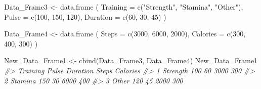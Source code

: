 \documentclass[
]{book}
\newenvironment{Shaded}{\begin{snugshade}}{\end{snugshade}}
\newcommand{\AttributeTok}[1]{\textcolor[rgb]{0.77,0.63,0.00}{#1}}
\newcommand{\CommentTok}[1]{\textcolor[rgb]{0.56,0.35,0.01}{\textit{#1}}}
\newcommand{\DecValTok}[1]{\textcolor[rgb]{0.00,0.00,0.81}{#1}}
\newcommand{\FunctionTok}[1]{\textcolor[rgb]{0.00,0.00,0.00}{#1}}
\newcommand{\NormalTok}[1]{#1}
\newcommand{\OtherTok}[1]{\textcolor[rgb]{0.56,0.35,0.01}{#1}}
\newcommand{\StringTok}[1]{\textcolor[rgb]{0.31,0.60,0.02}{#1}}
\begin{document}
\begin{Shaded}
\begin{Highlighting}[]
\NormalTok{Data\_Frame3 }\OtherTok{\textless{}{-}} \FunctionTok{data.frame}\NormalTok{ (}
  \AttributeTok{Training =} \FunctionTok{c}\NormalTok{(}\StringTok{"Strength"}\NormalTok{, }\StringTok{"Stamina"}\NormalTok{, }\StringTok{"Other"}\NormalTok{),}
  \AttributeTok{Pulse =} \FunctionTok{c}\NormalTok{(}\DecValTok{100}\NormalTok{, }\DecValTok{150}\NormalTok{, }\DecValTok{120}\NormalTok{),}
  \AttributeTok{Duration =} \FunctionTok{c}\NormalTok{(}\DecValTok{60}\NormalTok{, }\DecValTok{30}\NormalTok{, }\DecValTok{45}\NormalTok{)}
\NormalTok{)}

\NormalTok{Data\_Frame4 }\OtherTok{\textless{}{-}} \FunctionTok{data.frame}\NormalTok{ (}
  \AttributeTok{Steps =} \FunctionTok{c}\NormalTok{(}\DecValTok{3000}\NormalTok{, }\DecValTok{6000}\NormalTok{, }\DecValTok{2000}\NormalTok{),}
  \AttributeTok{Calories =} \FunctionTok{c}\NormalTok{(}\DecValTok{300}\NormalTok{, }\DecValTok{400}\NormalTok{, }\DecValTok{300}\NormalTok{)}
\NormalTok{)}

\NormalTok{New\_Data\_Frame1 }\OtherTok{\textless{}{-}} \FunctionTok{cbind}\NormalTok{(Data\_Frame3, Data\_Frame4)}
\NormalTok{New\_Data\_Frame1}
\CommentTok{\#\textgreater{}   Training Pulse Duration Steps Calories}
\CommentTok{\#\textgreater{} 1 Strength   100       60  3000      300}
\CommentTok{\#\textgreater{} 2  Stamina   150       30  6000      400}
\CommentTok{\#\textgreater{} 3    Other   120       45  2000      300}
\end{Highlighting}
\end{Shaded}


  
\end{document}
